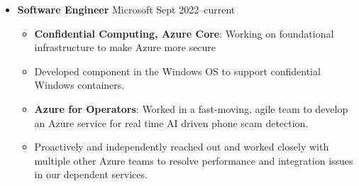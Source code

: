   \begin{itemize}
    \item \textbf{Software Engineer} %
    \dashdiv{} Microsoft \dashdiv{} Sept 2022--current



    \begin{itemize}
      \item \textbf{Confidential Computing, Azure Core}: Working on foundational infrastructure to make Azure more secure
      \item Developed component in the Windows OS to support confidential Windows containers.
      \item \textbf{Azure for Operators}: Worked in a fast-moving, agile team to develop an Azure service for real time AI driven phone scam detection.
      \item Proactively and independently reached out and worked closely with multiple other Azure teams to resolve performance and integration issues in our dependent services.
    \end{itemize}


\end{itemize}
